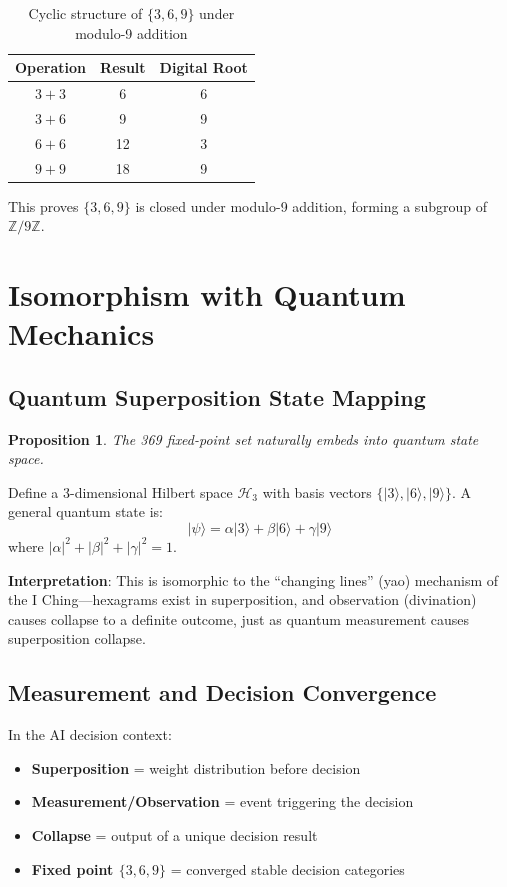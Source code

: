 \documentclass[conference]{IEEEtran}
\newtheorem{proposition}[theorem]{Proposition}
\theoremstyle{remark}
\newcommand{\Z}{\mathbb{Z}}
\begin{document}
\begin{table}[h]
\centering
\caption{Cyclic structure of $\{3,6,9\}$ under modulo-9 addition}
\label{tab:cyclic}
\begin{tabular}{ccc}
\toprule
Operation & Result & Digital Root \\
\midrule
$3+3$ & 6 & 6 \\
$3+6$ & 9 & 9 \\
$6+6$ & 12 & 3 \\
$9+9$ & 18 & 9 \\
\bottomrule
\end{tabular}
\end{table}

This proves $\{3,6,9\}$ is closed under modulo-9 addition, forming a subgroup of $\Z/9\Z$.

\section{Isomorphism with Quantum Mechanics}

\subsection{Quantum Superposition State Mapping}

\begin{proposition}
The 369 fixed-point set naturally embeds into quantum state space.
\end{proposition}

Define a 3-dimensional Hilbert space $\mathcal{H}_3$ with basis vectors $\{|3\rangle, |6\rangle, |9\rangle\}$. A general quantum state is:
\[
|\psi\rangle = \alpha|3\rangle + \beta|6\rangle + \gamma|9\rangle
\]
where $|\alpha|^2 + |\beta|^2 + |\gamma|^2 = 1$.

\textbf{Interpretation}: This is isomorphic to the ``changing lines'' (yao) mechanism of the I Ching---hexagrams exist in superposition, and observation (divination) causes collapse to a definite outcome, just as quantum measurement causes superposition collapse.

\subsection{Measurement and Decision Convergence}

In the AI decision context:
\begin{itemize}[nosep]
\item \textbf{Superposition} = weight distribution before decision
\item \textbf{Measurement/Observation} = event triggering the decision
\item \textbf{Collapse} = output of a unique decision result
\item \textbf{Fixed point $\{3,6,9\}$} = converged stable decision categories
\end{itemize}
\end{document}
